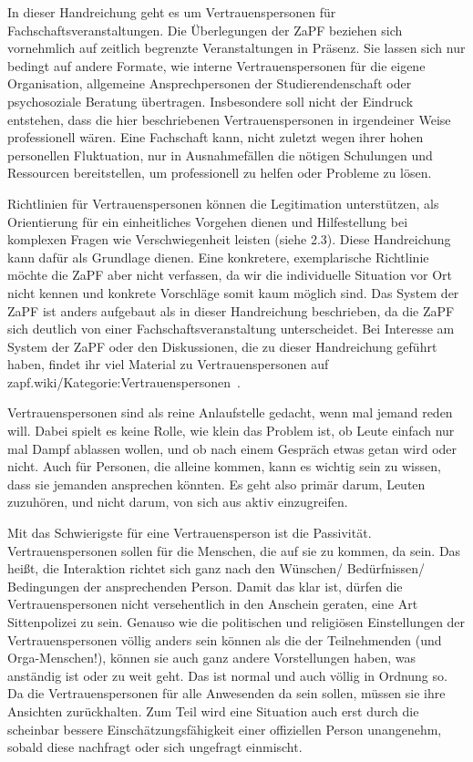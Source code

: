 \documentclass[DIV=calc]{scrartcl}
\begin{document}
In dieser Handreichung geht es um Vertrauenspersonen für Fachschaftsveranstaltungen. Die Überlegungen der ZaPF beziehen sich vornehmlich auf zeitlich begrenzte Veranstaltungen in Präsenz. Sie lassen sich nur bedingt auf andere Formate, wie interne Vertrauenspersonen für die eigene Organisation, allgemeine Ansprechpersonen der Studierendenschaft oder psychosoziale Beratung übertragen. Insbesondere soll nicht der Eindruck entstehen, dass die hier beschriebenen Vertrauenspersonen in irgendeiner Weise professionell wären. Eine Fachschaft kann, nicht zuletzt wegen ihrer hohen personellen Fluktuation, nur in Ausnahmefällen die nötigen Schulungen und Ressourcen bereitstellen, um professionell zu helfen oder Probleme zu lösen.

Richtlinien für Vertrauenspersonen können die Legitimation unterstützen, als Orientierung für ein einheitliches Vorgehen dienen und Hilfestellung bei komplexen Fragen wie Verschwiegenheit leisten (siehe 2.3).
Diese Handreichung kann dafür als Grundlage dienen. Eine konkretere, exemplarische Richtlinie möchte die ZaPF aber nicht verfassen, da wir die individuelle Situation vor Ort nicht kennen und konkrete Vorschläge somit kaum möglich sind. 
Das System der ZaPF ist anders aufgebaut als in dieser Handreichung beschrieben, da die ZaPF sich deutlich von einer Fachschaftsveranstaltung unterscheidet. Bei Interesse am System der ZaPF oder den Diskussionen, die zu dieser Handreichung geführt haben, findet ihr viel Material zu Vertrauenspersonen auf zapf.wiki/Kategorie:Vertrauenspersonen~.

Vertrauenspersonen sind als reine Anlaufstelle gedacht, wenn mal jemand reden will. Dabei spielt es keine Rolle, wie klein das Problem ist, ob Leute einfach nur mal Dampf ablassen wollen, und ob nach einem Gespräch etwas getan wird oder nicht. Auch für Personen, die alleine kommen, kann es wichtig sein zu wissen, dass sie jemanden ansprechen könnten. Es geht also primär darum, Leuten zuzuhören, und nicht darum, von sich aus aktiv einzugreifen.

Mit das Schwierigste für eine Vertrauensperson ist die Passivität. Vertrauenspersonen sollen für die Menschen, die auf sie zu kommen, da sein. Das heißt, die Interaktion richtet sich ganz nach den Wünschen/ Bedürfnissen/ Bedingungen der ansprechenden Person. Damit das klar ist, dürfen die Vertrauenspersonen nicht versehentlich in den Anschein geraten, eine Art Sittenpolizei zu sein. Genauso wie die politischen und religiösen Einstellungen der Vertrauenspersonen völlig anders sein können als die der Teilnehmenden (und Orga-Menschen!), können sie auch ganz andere Vorstellungen haben, was anständig ist oder zu weit geht. Das ist normal und auch völlig in Ordnung so. Da die Vertrauenspersonen für alle Anwesenden da sein sollen, müssen sie ihre Ansichten zurückhalten. Zum Teil wird eine Situation auch erst durch die scheinbar bessere Einschätzungsfähigkeit einer offiziellen Person unangenehm, sobald diese nachfragt oder sich ungefragt einmischt.
\end{document}
